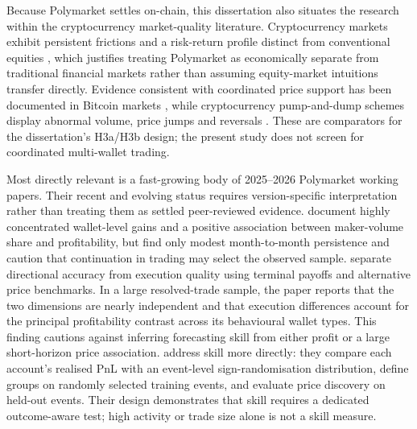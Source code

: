 Because Polymarket settles on-chain, this dissertation also situates the research within the cryptocurrency market-quality literature. Cryptocurrency markets exhibit persistent frictions and a risk-return profile distinct from conventional equities \citep{makarovschoar2020crypto,liutsyvinski2021crypto}, which justifies treating Polymarket as economically separate from traditional financial markets rather than assuming equity-market intuitions transfer directly. Evidence consistent with coordinated price support has been documented in Bitcoin markets \citep{griffinshams2020untethered}, while cryptocurrency pump-and-dump schemes display abnormal volume, price jumps and reversals \citep{li2025pumpdump}. These are comparators for the dissertation's H3a/H3b design; the present study does not screen for coordinated multi-wallet trading.

Most directly relevant is a fast-growing body of 2025--2026 Polymarket working papers. Their recent and evolving status requires version-specific interpretation rather than treating them as settled peer-reviewed evidence. \citet{akey2026winslosses} document highly concentrated wallet-level gains and a positive association between maker-volume share and profitability, but find only modest month-to-month persistence and caution that continuation in trading may select the observed sample. \citet{dellavedova2026execution} separate directional accuracy from execution quality using terminal payoffs and alternative price benchmarks. In a large resolved-trade sample, the paper reports that the two dimensions are nearly independent and that execution differences account for the principal profitability contrast across its behavioural wallet types. This finding cautions against inferring forecasting skill from either profit or a large short-horizon price association. \citet{gomezcram2026minority} address skill more directly: they compare each account's realised PnL with an event-level sign-randomisation distribution, define groups on randomly selected training events, and evaluate price discovery on held-out events. Their design demonstrates that skill requires a dedicated outcome-aware test; high activity or trade size alone is not a skill measure.

